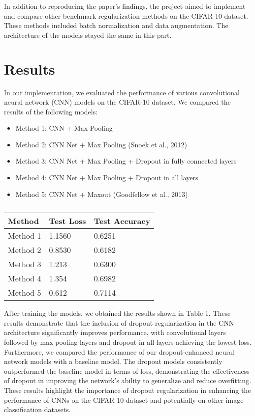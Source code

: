 \documentclass{article}
\begin{document}
In addition to reproducing the paper's findings, the project aimed to implement and compare other benchmark regularization methods on the CIFAR-10 dataset. These methods included batch normalization and data augmentation. The architecture of the models stayed the same in this part. 

\section{Results}

In our implementation, we evaluated the performance of various convolutional neural network (CNN) models on the CIFAR-10 dataset. We compared the results of the following models:
\begin{itemize}
\item Method 1: CNN + Max Pooling
\item Method 2: CNN Net + Max Pooling (Snoek et al., 2012)
\item Method 3: CNN Net + Max Pooling + Dropout in fully connected layers
\item Method 4: CNN Net + Max Pooling + Dropout in all layers
\item Method 5: CNN Net + Maxout (Goodfellow et al., 2013)
\end{itemize}


\begin{table}
\centering
\begin{tabular}{l|l|l}
Method & Test Loss & Test Accuracy \\\hline
Method 1 & 1.1560 & 0.6251 \\
Method 2 & 0.8530 & 0.6182 \\
Method 3 & 1.213 & 0.6300  \\
Method 4 & 1.354 & 0.6982  \\
Method 5 & 0.612 & 0.7114  
\end{tabular}
\caption{\label{tab:widgets}}
\end{table}

After training the models, we obtained the results shown in Table 1. These results demonstrate that the inclusion of dropout regularization in the CNN architecture significantly improves performance, with convolutional layers followed by max pooling layers and dropout in all layers achieving the lowest loss.
Furthermore, we compared the performance of our dropout-enhanced neural network models with a baseline model. The dropout models consistently outperformed the baseline model in terms of loss, demonstrating the effectiveness of dropout in improving the network's ability to generalize and reduce overfitting.
These results highlight the importance of dropout regularization in enhancing the performance of CNNs on the CIFAR-10 dataset and potentially on other image classification datasets. 
\end{document}
